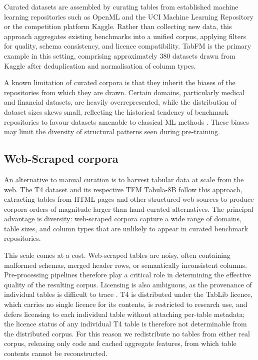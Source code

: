 \documentclass{article}
\begin{document}
Curated datasets are assembled by curating tables from established machine learning repositories such as OpenML \cite{vanschorenOpenMLNetworkedScience2014} and the UCI Machine Learning Repository \cite{bayUCIKDDArchive2000} or the competition platform Kaggle.
Rather than collecting new data, this approach aggregates existing benchmarks into a unified corpus, applying filters for quality, schema consistency, and licence compatibility. TabFM \cite{wenSupervisedGenerativeNovel2024} is the primary example in this setting, comprising approximately 380 datasets drawn from Kaggle after deduplication and normalisation of column types.

A known limitation of curated corpora is that they inherit the biases of the repositories from which they are drawn. Certain domains, particularly medical and financial datasets, are heavily overrepresented, while the distribution of dataset sizes skews small, reflecting the historical tendency of benchmark repositories to favour datasets amenable to classical ML methods \cite{liuTalentTabularAnalytics2025}. These biases may limit the diversity of structural patterns seen during pre-training.

\subsection{Web-Scraped corpora}

An alternative to manual curation is to harvest tabular data at scale from the web. The T4 dataset \cite{gardnerLargeScaleTransfer2024a} and its respective TFM Tabula-8B follow this approach, extracting tables from HTML pages and other structured web sources to produce corpora orders of magnitude larger than hand-curated alternatives. The principal advantage is diversity: web-scraped corpora capture a wide range of domains, table sizes, and column types that are unlikely to appear in curated benchmark repositories.

This scale comes at a cost. Web-scraped tables are noisy, often containing malformed schemas, merged header rows, or semantically inconsistent columns. Pre-processing pipelines therefore play a critical role in determining the effective quality of the resulting corpus.
Licensing is also ambiguous, as the provenance of individual tables is difficult to trace \cite{gardnerLargeScaleTransfer2024a}. T4 is distributed under the TabLib licence, which carries no single licence for its contents, is restricted to research use, and defers licensing to each individual table without attaching per-table metadata; the licence status of any individual T4 table is therefore not determinable from the distributed corpus.
For this reason we redistribute no tables from either real corpus, releasing only code and cached aggregate features, from which table contents cannot be reconstructed.
\end{document}

